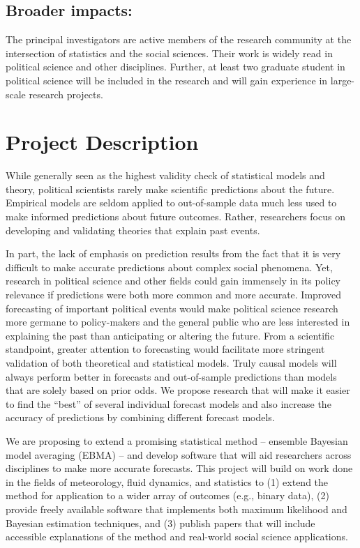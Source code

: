 \documentclass[pdftex,12pt,fullpage,oneside]{amsart}
\begin{document}
\subsection*{Broader impacts:}
The principal investigators are active members of the research
community at the intersection of statistics and the social
sciences. Their work is widely read in political science and other
disciplines. Further, at least two graduate student in political
science will be included in the research and will gain experience in
large-scale research projects.

\newpage
\setcounter{page}{1}

\section*{Project Description}

While generally seen as the highest validity check of statistical
models and theory, political scientists rarely make scientific
predictions about the future.  Empirical models are seldom applied to %
out-of-sample data much less used to make informed predictions about
future outcomes.  Rather, researchers focus on developing and
validating theories that explain past events.

In part, the lack of emphasis on prediction results from the fact that
it is very difficult to make accurate predictions about complex social
phenomena. Yet, research in political science and other fields could
gain immensely in its policy relevance if predictions were both more common
and more accurate.  Improved forecasting of important political events
would make political science research more germane to policy-makers
and the general public who are less interested in explaining the past
than anticipating or altering the future.  From a scientific
standpoint, greater attention to forecasting would facilitate more
stringent validation of both theoretical and statistical models. Truly causal models will always perform better in forecasts and out-of-sample predictions than models that are solely based on prior odds. We propose research that will make it easier to find the ``best'' of several individual forecast models and also increase the accuracy of predictions by combining different forecast models. 

We are proposing to extend a promising statistical method -- ensemble Bayesian model averaging
(EBMA) -- and develop software that will aid researchers across
disciplines to make more accurate forecasts.  This project will build
on work done in the fields of meteorology, fluid dynamics, and
statistics to (1) extend the method for application to a wider array
of outcomes (e.g., binary data), (2) provide freely available software
that implements both maximum likelihood and Bayesian estimation
techniques, and (3) publish papers that will include accessible
explanations of the method and real-world social science applications.
\end{document}
